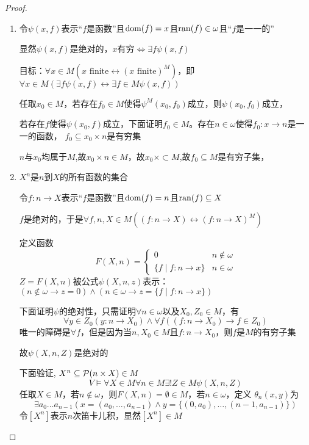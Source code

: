 \documentclass[11pt]{article}
\begin{document}
\begin{proof}
\begin{enumerate}
\item 令\(\psi(x,f)\)表示“\(f\)是函数”且\(\operatorname{dom}(f)=x\)且\(\operatorname{ran}(f)\in\omega\)且``\(f\)是一一的''

显然\(\psi(x,f)\)是绝对的，\(x\)有穷\(\Leftrightarrow \exists f\psi(x,f)\)

目标：\(\forall x\in M(x\text{ finite}\leftrightarrow(x\text{ finite})^M)\)，即
\(\forall x\in M(\exists f\psi(x,f)\leftrightarrow\exists f\in M\psi(x,f))\)

任取\(x_0\in M\)，若存在\(f_0\in M\)使得\(\psi^M(x_0,f_0)\)成立，则\(\psi(x_0,f_0)\)成立，

若存在\(f\)使得\(\psi(x_0,f)\)成立，下面证明\(f_0\in M\)。存在\(n\in\omega\)使得\(f_0:x\to n\)是一一的函数，
\(f_0\subseteq x_0\times n\)是有穷集

\(n\)与\(x_0\)均属于\(M\),故\(x_0\times n\in M\)，故\(x_0\times\subset M\),故\(f_0\subseteq M\)是有穷子集，

\item \(X^n\)是\(n\)到\(X\)的所有函数的集合

令\(f:n\to X\)表示“\(f\)是函数”且\(\operatorname{dom}(f)=n\)且\(\operatorname{ran}(f)\subseteq X\)

\(f\)是绝对的，于是\(\forall f,n,X\in M((f:n\to X)\leftrightarrow(f:n\to X)^M)\)

定义函数
\begin{equation*}
F(X,n)=
\begin{cases}
0&n\notin\omega\\
\{f\mid f:n\to x\}&n\in\omega
\end{cases}
\end{equation*}
\(Z=F(X,n)\)被公式\(\psi(X,n,z)\)表示：\((n\notin\omega\to z=0)\wedge(n\in\omega\to z=\{f\mid f:n\to x\})\)

下面证明\(\psi\)的绝对性，只需证明\(\forall n\in\omega\)以及\(X_0,Z_0\in M\)，有
\begin{equation*}
\forall y\in Z_0(y:n\to X_0)\wedge\forall f((f:n\to X_0)\to f\in Z_0)
\end{equation*}
唯一的障碍是\(\forall f\)，但是因为当\(n,X_0\in M\)且\(f:n\to X_0\)，则\(f\)是\(M\)的有穷子集

故\(\psi(X,n,Z)\)是绝对的

下面验证, \(X^n\subseteq\mathcal{P}(n\times X)\in M\)
\begin{equation*}
V\vDash\forall X\in M\forall n\in M\exists!Z\in M\psi(X,n,Z)
\end{equation*}
任取\(X\in M\)，若\(n\notin\omega\)，则\(F(X,n)=\emptyset\in M\)，若\(n\in\omega\)，定义
\(\theta_n(x,y)\)为
\begin{equation*}
\exists a_0\dots a_{n-1}(x=(a_0,\dots,a_{n-1})\wedge y=\{(0,a_0),\dots,(n-1,a_{n-1})\})
\end{equation*}
令\([X^n]\)表示\(n\)次笛卡儿积，显然\([X^n]\in M\)


\end{enumerate}
\end{proof}
\end{document}
